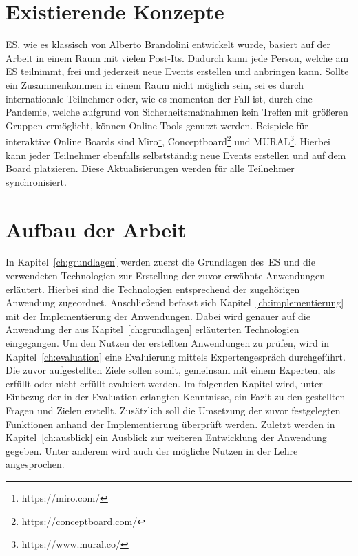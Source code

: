 \section{Existierende Konzepte}\label{sec:existierende-konzepte}
\ac{ES}, wie es klassisch von Alberto Brandolini entwickelt wurde, basiert auf der Arbeit in einem Raum mit vielen Post-Its.
Dadurch kann jede Person, welche am \ac{ES} teilnimmt, frei und jederzeit neue Events erstellen und anbringen kann.
Sollte ein Zusammenkommen in einem Raum nicht möglich sein, sei es durch internationale Teilnehmer oder, wie es momentan der Fall ist,
durch eine Pandemie, welche aufgrund von Sicherheitsmaßnahmen kein Treffen mit größeren Gruppen ermöglicht, können Online-Tools genutzt werden.
Beispiele für interaktive Online Boards sind Miro\footnote{https://miro.com/}, Conceptboard\footnote{https://conceptboard.com/} und MURAL\footnote{https://www.mural.co/}.
Hierbei kann jeder Teilnehmer ebenfalls selbstständig neue Events erstellen und auf dem Board platzieren.
Diese Aktualisierungen werden für alle Teilnehmer synchronisiert.


\section{Aufbau der Arbeit}\label{sec:aufbau-der-arbeit}
In Kapitel~\ref{ch:grundlagen} werden zuerst die Grundlagen des~\ac{ES} und die verwendeten Technologien
zur Erstellung der zuvor erwähnte Anwendungen erläutert.
Hierbei sind die Technologien entsprechend der zugehörigen Anwendung zugeordnet.
Anschließend befasst sich Kapitel~\ref{ch:implementierung} mit der Implementierung der Anwendungen.
Dabei wird genauer auf die Anwendung der aus Kapitel~\ref{ch:grundlagen} erläuterten Technologien eingegangen.
Um den Nutzen der erstellten Anwendungen zu prüfen, wird in Kapitel~\ref{ch:evaluation} eine Evaluierung mittels Expertengespräch durchgeführt.
Die zuvor aufgestellten Ziele sollen somit, gemeinsam mit einem Experten, als erfüllt oder nicht erfüllt evaluiert werden.
Im folgenden Kapitel wird, unter Einbezug der in der Evaluation erlangten Kenntnisse, ein Fazit zu den gestellten Fragen und Zielen erstellt.
Zusätzlich soll die Umsetzung der zuvor festgelegten Funktionen anhand der Implementierung überprüft werden.
Zuletzt werden in Kapitel~\ref{ch:ausblick} ein Ausblick zur weiteren Entwicklung der Anwendung gegeben.
Unter anderem wird auch der mögliche Nutzen in der Lehre angesprochen.
